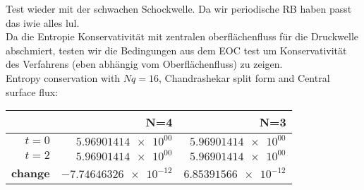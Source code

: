 \documentclass[11pt]{scrartcl}
\begin{document}
Test wieder mit der schwachen Schockwelle. Da wir periodische RB haben passt das iwie alles lul.\\
Da die Entropie Konservativität mit zentralen oberflächenfluss für die Druckwelle abschmiert, testen wir die Bedingungen aus dem EOC test um Konservativität des Verfahrens (eben abhängig vom Oberflächenfluss) zu zeigen.\\
Entropy conservation with $Nq = 16$, Chandrashekar split form and Central surface flux: \\
\begin{table}[H]
\centering
\begin{tabular}{|r|r|r|}
    \hline\hline
     & \textbf{N=4} & \textbf{N=3} \\\hline
    \textbf{$t=0$} & $\num{5.96901414e+00}$ & $\num{5.96901414e+00}$ \\
    \textbf{$t=2$} &  $\num{5.96901414e+00}$ & $\num{5.96901414e+00}$ \\
    \textbf{change} & $\num{-7.74646326e-12}$ & $\num{6.85391566e-12}$ \\\hline\hline
\end{tabular}
\end{table}

\newpage
{}


\end{document}
